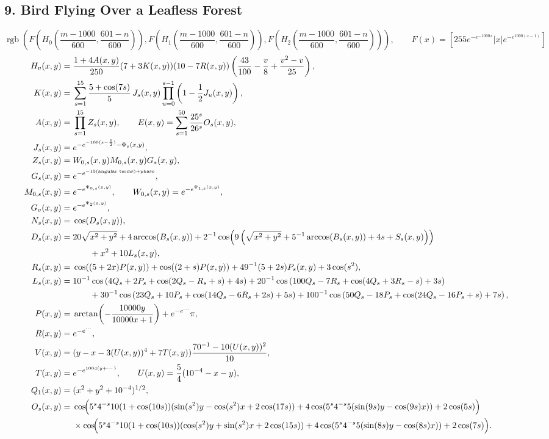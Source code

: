 \documentclass[10pt]{article}
\newcommand{\Fn}{F(x)=\left[255e^{-e^{-1000x}}|x|e^{-e^{1000(x-1)}}\right]}
\begin{document}
\begin{landscape}
\section*{9. Bird Flying Over a Leafless Forest}
\[
\operatorname{rgb}\!\left(
F\!\left(H_0\!\left(\frac{m-1000}{600},\frac{601-n}{600}\right)\right),
F\!\left(H_1\!\left(\frac{m-1000}{600},\frac{601-n}{600}\right)\right),
F\!\left(H_2\!\left(\frac{m-1000}{600},\frac{601-n}{600}\right)\right)
\right),\qquad \Fn
\]
\begin{align*}
H_v(x,y)={}&
\frac{1+4A(x,y)}{250}(7+3K(x,y))(10-7R(x,y))
\left(\frac{43}{100}-\frac v8+\frac{v^2-v}{25}\right),
\\
K(x,y)={}&
\sum_{s=1}^{15}\frac{5+\cos(7s)}5\,J_s(x,y)
\prod_{u=0}^{s-1}\left(1-\frac12J_u(x,y)\right),
\\
A(x,y)={}&\prod_{s=1}^{15}Z_s(x,y),
\qquad
E(x,y)=\sum_{s=1}^{50}\frac{25^s}{26^s}O_s(x,y),
\\
J_s(x,y)={}&e^{-e^{-100(s-\frac12)}-\Phi_s(x,y)},
\\
Z_s(x,y)={}&W_{0,s}(x,y)M_{0,s}(x,y)G_s(x,y),
\\
G_s(x,y)={}&
e^{-e^{-15(\text{angular terms})+\text{phase}}},
\\
M_{0,s}(x,y)={}&e^{-e^{\Psi_{0,s}(x,y)}},
\qquad
W_{0,s}(x,y)=e^{-e^{\Psi_{1,s}(x,y)}},
\\
G_v(x,y)={}&e^{-e^{\Psi_2(x,y)}},
\\
N_s(x,y)={}&\cos(D_s(x,y)),
\\
D_s(x,y)={}&
20\sqrt{x^2+y^2}
+4\arccos(B_s(x,y))
+2^{-1}\cos\!\left(
9\left(\sqrt{x^2+y^2}+5^{-1}\arccos(B_s(x,y))+4s+S_s(x,y)\right)
\right)
\\
&\qquad+x^2+10L_s(x,y),
\\
R_s(x,y)={}&
\cos((5+2x)P(x,y))
+\cos((2+s)P(x,y))
+49^{-1}(5+2s)P_s(x,y)+3\cos(s^2),
\\
L_s(x,y)={}&
10^{-1}\cos\left(4Q_s+2P_s+\cos(2Q_s-R_s+s)+4s\right)
+20^{-1}\cos\left(100Q_s-7R_s+\cos(4Q_s+3R_s-s)+3s\right)
\\
&\qquad
+30^{-1}\cos\left(23Q_s+10P_s+\cos(14Q_s-6R_s+2s)+5s\right)
+100^{-1}\cos\left(50Q_s-18P_s+\cos(24Q_s-16P_s+s)+7s\right),
\\
P(x,y)={}&\arctan\!\left(-\frac{10000y}{10000x+1}\right)+e^{-e^{\cdots}}\pi,
\\
R(x,y)={}&e^{-e^{\cdots}},
\\
V(x,y)={}&(y-x-3(U(x,y))^4+7T(x,y))
\frac{70^{-1}-10(U(x,y))^2}{10},
\\
T(x,y)={}&e^{-e^{1004(y+\cdots)}},
\qquad
U(x,y)=\frac54(10^{-4}-x-y),
\\
Q_1(x,y)={}&(x^2+y^2+10^{-4})^{1/2},
\\
O_s(x,y)={}&
\cos\!\Bigl(5^s4^{-s}10(1+\cos(10s))(\sin(s^2)y-\cos(s^2)x+2\cos(17s))
+4\cos(5^s4^{-s}5(\sin(9s)y-\cos(9s)x))+2\cos(5s)\Bigr)
\\
&\times
\cos\!\Bigl(5^s4^{-s}10(1+\cos(10s))(\cos(s^2)y+\sin(s^2)x+2\cos(15s))
+4\cos(5^s4^{-s}5(\sin(8s)y-\cos(8s)x))+2\cos(7s)\Bigr).
\end{align*}


\end{landscape}
\end{document}
